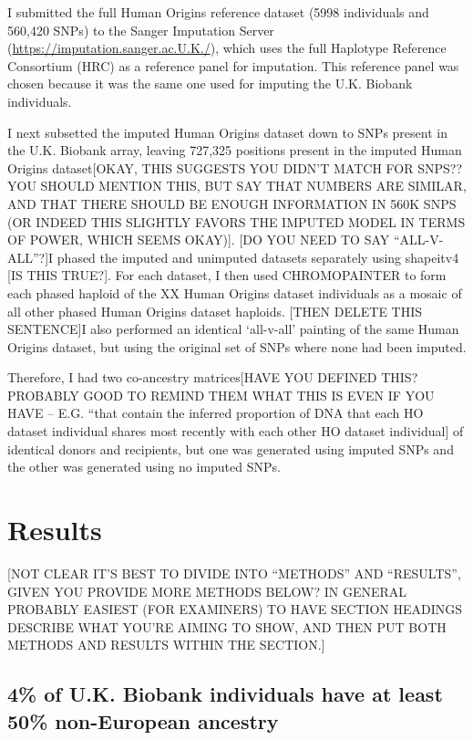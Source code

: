 {I submitted the full Human Origins reference dataset (5998 individuals and 560,420 SNPs) to the Sanger Imputation Server (\url{https://imputation.sanger.ac.U.K./}), which uses the full Haplotype Reference Consortium (HRC) as a reference panel for imputation. This reference panel was chosen because it was the same one used for imputing the U.K. Biobank individuals.

I next subsetted the imputed Human Origins dataset down to SNPs present in the U.K. Biobank array, leaving 727,325 positions present in the imputed Human Origins dataset{\color{red}[OKAY, THIS SUGGESTS YOU DIDN'T MATCH FOR SNPS?? YOU SHOULD MENTION THIS, BUT SAY THAT NUMBERS ARE SIMILAR, AND THAT THERE SHOULD BE ENOUGH INFORMATION IN 560K SNPS (OR INDEED THIS SLIGHTLY FAVORS THE IMPUTED MODEL IN TERMS OF POWER, WHICH SEEMS OKAY)]}. {\color{red}[DO YOU NEED TO SAY ``ALL-V-ALL''?]I phased the imputed and unimputed datasets separately using shapeitv4 [IS THIS TRUE?]. For each dataset, I then used CHROMOPAINTER to form each phased haploid of the XX Human Origins dataset individuals as a mosaic of all other phased Human Origins dataset haploids. [THEN DELETE THIS SENTENCE]I also performed an identical `all-v-all' painting of the same Human Origins dataset, but using the original set of SNPs where none had been imputed.}

Therefore, I had {\color{red}two co-ancestry matrices[HAVE YOU DEFINED THIS? PROBABLY GOOD TO REMIND THEM WHAT THIS IS EVEN IF YOU HAVE -- E.G. ``that contain the inferred proportion of DNA that each HO dataset individual shares most recently with each other HO dataset individual]} of identical donors and recipients, but one was generated using imputed SNPs and the other was generated using no imputed SNPs. 


\section{Results}

{\color{red}[NOT CLEAR IT'S BEST TO DIVIDE INTO ``METHODS'' AND ``RESULTS'', GIVEN YOU PROVIDE MORE METHODS BELOW? IN GENERAL PROBABLY EASIEST (FOR EXAMINERS) TO HAVE SECTION HEADINGS DESCRIBE WHAT YOU'RE AIMING TO SHOW, AND THEN PUT BOTH METHODS AND RESULTS WITHIN THE SECTION.]}

\subsection{4\% of U.K. Biobank individuals have at least 50\% non-European ancestry}

}
